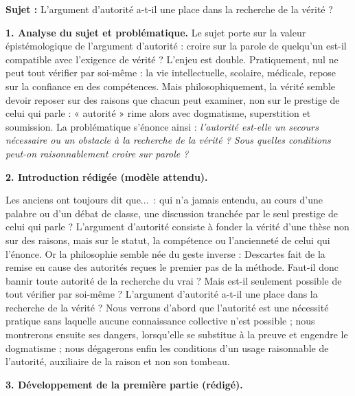 \documentclass[11pt]{article}
\begin{document}
\begin{corrige}
\textbf{Sujet :} L'argument d'autorité a-t-il une place dans la recherche de la vérité ?

\tcblower

\textbf{1. Analyse du sujet et problématique.} Le sujet porte sur la valeur épistémologique de l'argument d'autorité : croire sur la parole de quelqu'un est-il compatible avec l'exigence de vérité ? L'enjeu est double. Pratiquement, nul ne peut tout vérifier par soi-même : la vie intellectuelle, scolaire, médicale, repose sur la confiance en des compétences. Mais philosophiquement, la vérité semble devoir reposer sur des raisons que chacun peut examiner, non sur le prestige de celui qui parle : « autorité » rime alors avec dogmatisme, superstition et soumission. La problématique s'énonce ainsi : \emph{l'autorité est-elle un secours nécessaire ou un obstacle à la recherche de la vérité ? Sous quelles conditions peut-on raisonnablement croire sur parole ?}

\textbf{2. Introduction rédigée (modèle attendu).}

\guillemotleft Les anciens ont toujours dit que...\guillemotright\ : qui n'a jamais entendu, au cours d'une palabre ou d'un débat de classe, une discussion tranchée par le seul prestige de celui qui parle ? L'argument d'autorité consiste à fonder la vérité d'une thèse non sur des raisons, mais sur le statut, la compétence ou l'ancienneté de celui qui l'énonce. Or la philosophie semble née du geste inverse : Descartes fait de la remise en cause des autorités reçues le premier pas de la méthode. Faut-il donc bannir toute autorité de la recherche du vrai ? Mais est-il seulement possible de tout vérifier par soi-même ? L'argument d'autorité a-t-il une place dans la recherche de la vérité ? Nous verrons d'abord que l'autorité est une nécessité pratique sans laquelle aucune connaissance collective n'est possible ; nous montrerons ensuite ses dangers, lorsqu'elle se substitue à la preuve et engendre le dogmatisme ; nous dégagerons enfin les conditions d'un usage raisonnable de l'autorité, auxiliaire de la raison et non son tombeau.

\textbf{3. Développement de la première partie (rédigé).}


\end{corrige}
\end{document}
